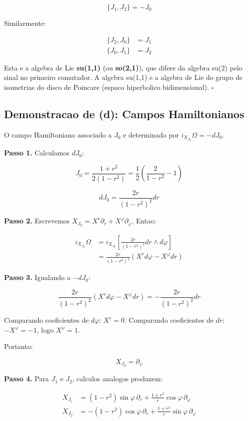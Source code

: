 \documentclass[12pt,a4paper,oneside]{article}
\begin{document}
$$\boxed{\{J_1, J_2\} = -J_0}$$

Similarmente:

\begin{align*}
\{J_2, J_0\} &= J_1 \\
\{J_0, J_1\} &= J_2
\end{align*}

Esta e a algebra de Lie \textbf{su(1,1)} (ou \textbf{so(2,1)}), que difere
da algebra su(2) pelo sinal no primeiro comutador. A algebra su(1,1) e a
algebra de Lie do grupo de isometrias do disco de Poincare (espaco
hiperbolico bidimensional). $\square$

\subsection*{Demonstracao de (d): Campos Hamiltonianos}

O campo Hamiltoniano associado a $J_0$ e determinado por
$i_{X_{J_0}}\Omega = -dJ_0$.

\textbf{Passo 1.} Calculamos $dJ_0$:

$$J_0 = \frac{1+r^2}{2(1-r^2)} = \frac{1}{2}\left(\frac{2}{1-r^2} - 1\right)$$

$$dJ_0 = \frac{2r}{(1-r^2)^2} dr$$

\textbf{Passo 2.} Escrevemos $X_{J_0} = X^r\partial_r + X^\varphi\partial_\varphi$.
Entao:

\begin{align*}
i_{X_{J_0}}\Omega &= i_{X_{J_0}}\left[\frac{2r}{(1-r^2)^2}dr\wedge d\varphi\right] \\
&= \frac{2r}{(1-r^2)^2}\left(X^r d\varphi - X^\varphi dr\right)
\end{align*}

\textbf{Passo 3.} Igualando a $-dJ_0$:

$$\frac{2r}{(1-r^2)^2}\left(X^r d\varphi - X^\varphi dr\right) =
-\frac{2r}{(1-r^2)^2} dr$$

Comparando coeficientes de $d\varphi$: $X^r = 0$.
Comparando coeficientes de $dr$: $-X^\varphi = -1$, logo $X^\varphi = 1$.

Portanto:

$$\boxed{X_{J_0} = \partial_\varphi}$$

\textbf{Passo 4.} Para $J_1$ e $J_2$, calculos analogos produzem:

\begin{align*}
X_{J_1} &= (1-r^2)\sin\varphi \, \partial_r + \frac{1+r^2}{r}\cos\varphi \, \partial_\varphi \\
X_{J_2} &= -(1-r^2)\cos\varphi \, \partial_r + \frac{1+r^2}{r}\sin\varphi \, \partial_\varphi
\end{align*}
\end{document}
